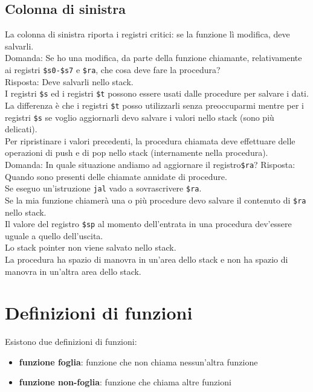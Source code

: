 \documentclass[../main.tex]{subfiles}
\begin{document}
\subsection*{Colonna di sinistra}
La colonna di sinistra riporta i registri critici: se la funzione
lì modifica, deve salvarli. \\[5mm]
Domanda: Se ho una modifica, da parte della funzione chiamante,
relativamente ai registri \texttt{\$s0-\$s7} e \texttt{\$ra},
che cosa deve fare la procedura? \\
Risposta: Deve salvarli nello stack. \\
I registri \texttt{\$s} ed i registri \texttt{\$t} possono essere
usati dalle procedure per salvare i dati. La differenza è che i registri
\texttt{\$t} posso utilizzarli senza preoccuparmi mentre per i registri
\texttt{\$s} se voglio aggiornarli devo salvare i valori nello stack
(sono più delicati). \\
Per ripristinare i valori precedenti, la procedura chiamata
deve effettuare delle operazioni di push e di pop nello stack
(internamente nella procedura). \\[3mm]
Domanda: In quale situazione andiamo ad aggiornare il registro\texttt{\$ra}?
Risposta: Quando sono presenti delle chiamate annidate di procedure. \\
Se eseguo un'istruzione \texttt{jal} vado a sovrascrivere \texttt{\$ra}. \\
Se la mia funzione chiamerà una o più procedure devo salvare il contenuto
di \texttt{\$ra} nello stack. \\
Il valore del registro \texttt{\$sp} al momento dell'entrata
in una procedura dev'essere uguale a quello dell'uscita. \\
Lo stack pointer non viene salvato nello stack. \\[5mm]
La procedura ha spazio di manovra in un'area dello stack e non ha
spazio di manovra in un'altra area dello stack.

\newpage

\section{Definizioni di funzioni}
Esistono due definizioni di funzioni:
\begin{itemize}
    \item \textbf{funzione foglia}: funzione che non chiama nessun'altra funzione
    \item \textbf{funzione non-foglia}: funzione che chiama altre funzioni
\end{itemize}
\end{document}
